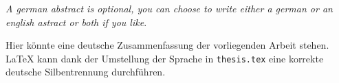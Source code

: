 \textit{A german abstract is optional, you can choose to write either a german or an english astract or both if you like}.

Hier könnte eine deutsche Zusammenfassung der vorliegenden Arbeit stehen.
\LaTeX{} kann dank der Umstellung der Sprache in \texttt{thesis.tex} eine korrekte deutsche Silbentrennung durchführen.

